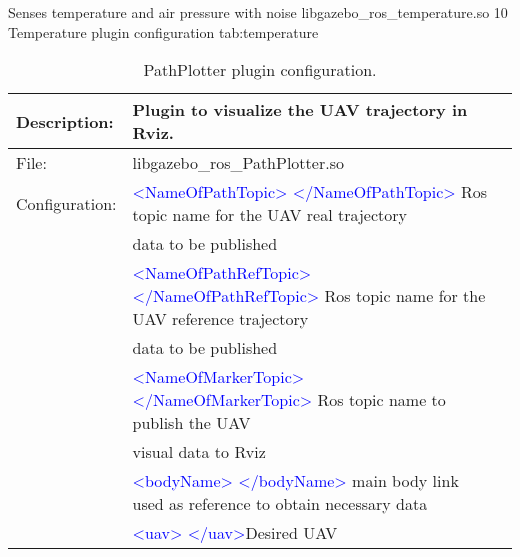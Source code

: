 \begin{plugintable}
	{Senses temperature and air pressure with noise}
	{libgazebo\_ros\_temperature.so}
	{10}
	{Temperature plugin configuration}
	{tab:temperature}
\end{plugintable}


\begin{table}[h]
	\centering			
	\begin{tabular}{|r|lr|}
		\hline
		\multicolumn{1}{|l|}{Description: } & Plugin to visualize the UAV trajectory in Rviz. &        \\
		\hline
		\multicolumn{1}{|l|}{File: } & libgazebo\_ros\_PathPlotter.so &        \\
		\hline
		\multicolumn{1}{|l|}{Configuration:} & \textcolor{blue}{<NameOfPathTopic> </NameOfPathTopic>} Ros topic name for the UAV real trajectory  &         \\
		&  data to be published &        \\
		& \textcolor{blue}{<NameOfPathRefTopic> </NameOfPathRefTopic>} Ros topic name for the UAV reference trajectory &        \\
		& data to be published &		\\
		& \textcolor{blue}{<NameOfMarkerTopic> </NameOfMarkerTopic>} Ros topic name to publish the UAV  &         \\
		& visual data to Rviz &         \\
		& \textcolor{blue}{<bodyName> </bodyName>} main body link used as reference to obtain necessary data  &        \\
		& \textcolor{blue}{<uav> </uav>}Desired UAV &         \\
		\hline
	\end{tabular}%
	\caption{PathPlotter plugin configuration.}
	\label{tab:PathPlotter}%
\end{table}%


